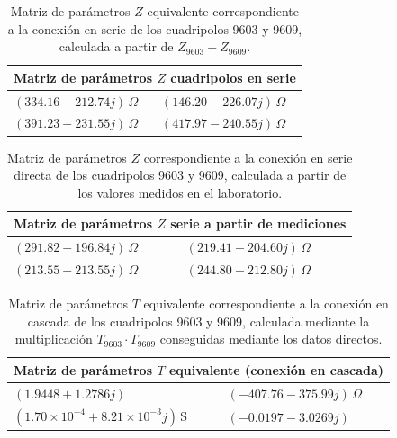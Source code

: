 \begin{table}[H]
\centering
\begin{tabular}{|l|l|}
\hline
\multicolumn{2}{|c|}{\textbf{Matriz de parámetros $Z$ cuadripolos en serie}} \\ \hline
$(334.16 - 212.74j)\,\Omega$ & $(146.20 - 226.07j)\,\Omega$ \\ \hline
$(391.23 - 231.55j)\,\Omega$ & $(417.97 - 240.55j)\,\Omega$ \\ \hline
\end{tabular}
\caption{Matriz de parámetros $Z$ equivalente correspondiente a la conexión en serie de los cuadripolos 9603 y 9609, calculada a partir de $Z_{9603} + Z_{9609}$.}
\label{tab:matriz_Z_serie_9603_9609}
\end{table}

\begin{table}[H]
\centering
\begin{tabular}{|l|l|}
\hline
\multicolumn{2}{|c|}{\textbf{Matriz de parámetros $Z$ serie a partir de mediciones}} \\ \hline
$(291.82 - 196.84j)\,\Omega$ & $(219.41 - 204.60j)\,\Omega$ \\ \hline
$(213.55 - 213.55j)\,\Omega$ & $(244.80 - 212.80j)\,\Omega$ \\ \hline
\end{tabular}
\caption{Matriz de parámetros $Z$ correspondiente a la conexión en serie directa de los cuadripolos 9603 y 9609, calculada a partir de los valores medidos en el laboratorio.}
\label{tab:matriz_Z_serie_directa}
\end{table}

\begin{table}[H]
\centering
\begin{tabular}{|l|l|}
\hline
\multicolumn{2}{|c|}{\textbf{Matriz de parámetros $T$ equivalente (conexión en cascada)}} \\ \hline
$(1.9448 + 1.2786j)$ & $(-407.76 - 375.99j)\,\Omega$ \\ \hline
$(1.70\times10^{-4} + 8.21\times10^{-3}j)\,\mathrm{S}$ & $(-0.0197 - 3.0269j)$ \\ \hline
\end{tabular}
\caption{Matriz de parámetros $T$ equivalente correspondiente a la conexión en cascada de los cuadripolos 9603 y 9609, calculada mediante la multiplicación $T_{9603} \cdot T_{9609}$ conseguidas mediante los datos directos.}
\label{tab:matriz_T_cascada_procuto}
\end{table}

